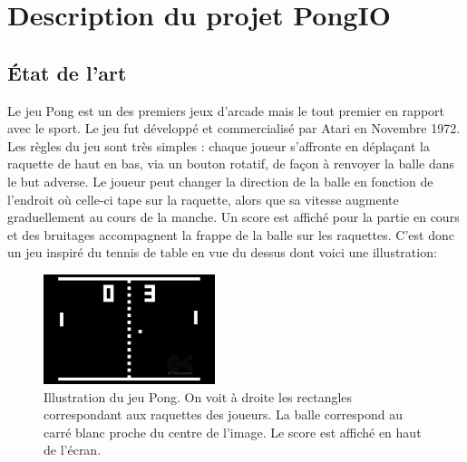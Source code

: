 \chapter{Description du projet PongIO}
\label{chap:premier chapitre}

\section{État de l'art}
Le jeu Pong est un des premiers jeux d'arcade mais le tout premier en rapport avec le sport. Le jeu fut développé et commercialisé par Atari en Novembre 1972. Les règles du jeu sont très simples : chaque joueur s'affronte en déplaçant la raquette de haut en bas, via un bouton rotatif, de façon à renvoyer la balle dans le but adverse. Le joueur peut changer la direction de la balle en fonction de l'endroit où celle-ci tape sur la raquette, alors que sa vitesse augmente graduellement au cours de la manche. Un score est affiché pour la partie en cours et des bruitages accompagnent la frappe de la balle sur les raquettes. C'est donc un jeu inspiré du tennis de table en vue du dessus dont voici une illustration:

\begin{figure}[H]
  \center
  \includegraphics[width=5cm]{images/pong}
  \centering
  \caption{Illustration du jeu Pong. On voit à droite les rectangles correspondant aux raquettes des joueurs. La balle correspond au carré blanc proche du centre de l'image. Le score est affiché en haut de l'écran.}
  \label{fig:une-image}
\end{figure}


